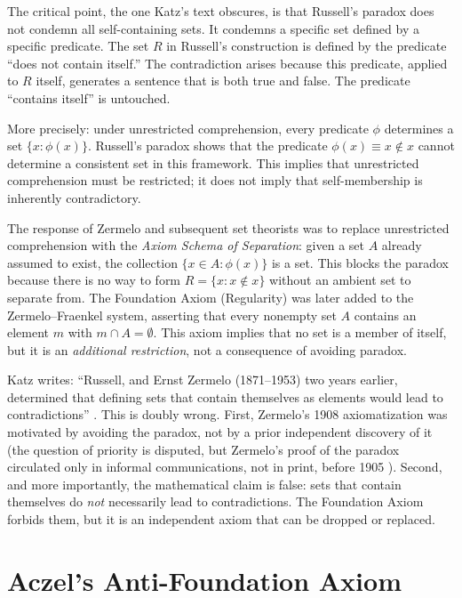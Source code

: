 \documentclass[12pt]{article}
\theoremstyle{definition}
\begin{document}
The critical point, the one Katz's text obscures, is that Russell's paradox does not condemn all self-containing sets. It condemns a specific set defined by a specific predicate. The set $R$ in Russell's construction is defined by the predicate ``does not contain itself.'' The contradiction arises because this predicate, applied to $R$ itself, generates a sentence that is both true and false. The predicate ``contains itself'' is untouched.

More precisely: under unrestricted comprehension, every predicate $\phi$ determines a set $\{x : \phi(x)\}$. Russell's paradox shows that the predicate $\phi(x) \equiv x \notin x$ cannot determine a consistent set in this framework. This implies that unrestricted comprehension must be restricted; it does not imply that self-membership is inherently contradictory.

The response of Zermelo and subsequent set theorists was to replace unrestricted comprehension with the \emph{Axiom Schema of Separation}: given a set $A$ already assumed to exist, the collection $\{x \in A : \phi(x)\}$ is a set. This blocks the paradox because there is no way to form $R = \{x : x \notin x\}$ without an ambient set to separate from. The Foundation Axiom (Regularity) was later added to the Zermelo--Fraenkel system, asserting that every nonempty set $A$ contains an element $m$ with $m \cap A = \emptyset$. This axiom implies that no set is a member of itself, but it is an \emph{additional restriction}, not a consequence of avoiding paradox.

Katz writes: ``Russell, and Ernst Zermelo (1871--1953) two years earlier, determined that defining sets that contain themselves as elements would lead to contradictions'' \cite{katz}. This is doubly wrong. First, Zermelo's 1908 axiomatization was motivated by avoiding the paradox, not by a prior independent discovery of it (the question of priority is disputed, but Zermelo's proof of the paradox circulated only in informal communications, not in print, before 1905 \cite{moore_zermelo}). Second, and more importantly, the mathematical claim is false: sets that contain themselves do \emph{not} necessarily lead to contradictions. The Foundation Axiom forbids them, but it is an independent axiom that can be dropped or replaced.

\section{Aczel's Anti-Foundation Axiom}
\end{document}

